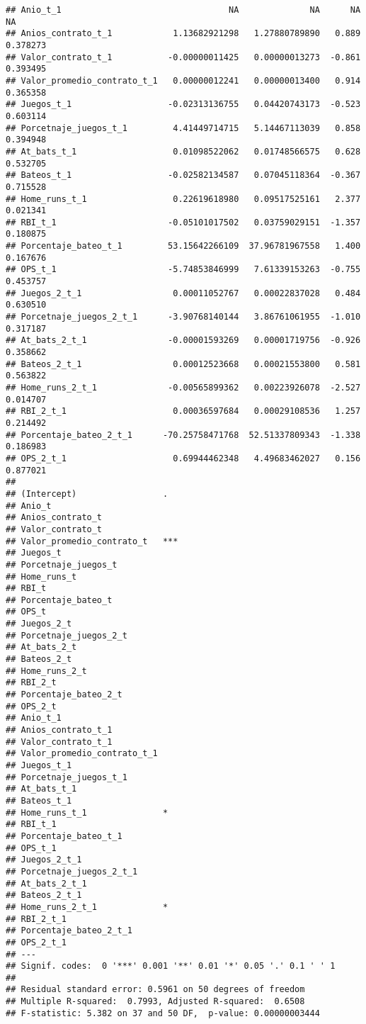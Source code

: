 \documentclass[
]{article}
\begin{document}
\begin{verbatim}
## Anio_t_1                                 NA              NA      NA       NA
## Anios_contrato_t_1            1.13682921298   1.27880789890   0.889 0.378273
## Valor_contrato_t_1           -0.00000011425   0.00000013273  -0.861 0.393495
## Valor_promedio_contrato_t_1   0.00000012241   0.00000013400   0.914 0.365358
## Juegos_t_1                   -0.02313136755   0.04420743173  -0.523 0.603114
## Porcetnaje_juegos_t_1         4.41449714715   5.14467113039   0.858 0.394948
## At_bats_t_1                   0.01098522062   0.01748566575   0.628 0.532705
## Bateos_t_1                   -0.02582134587   0.07045118364  -0.367 0.715528
## Home_runs_t_1                 0.22619618980   0.09517525161   2.377 0.021341
## RBI_t_1                      -0.05101017502   0.03759029151  -1.357 0.180875
## Porcentaje_bateo_t_1         53.15642266109  37.96781967558   1.400 0.167676
## OPS_t_1                      -5.74853846999   7.61339153263  -0.755 0.453757
## Juegos_2_t_1                  0.00011052767   0.00022837028   0.484 0.630510
## Porcetnaje_juegos_2_t_1      -3.90768140144   3.86761061955  -1.010 0.317187
## At_bats_2_t_1                -0.00001593269   0.00001719756  -0.926 0.358662
## Bateos_2_t_1                  0.00012523668   0.00021553800   0.581 0.563822
## Home_runs_2_t_1              -0.00565899362   0.00223926078  -2.527 0.014707
## RBI_2_t_1                     0.00036597684   0.00029108536   1.257 0.214492
## Porcentaje_bateo_2_t_1      -70.25758471768  52.51337809343  -1.338 0.186983
## OPS_2_t_1                     0.69944462348   4.49683462027   0.156 0.877021
##                                
## (Intercept)                 .  
## Anio_t                         
## Anios_contrato_t               
## Valor_contrato_t               
## Valor_promedio_contrato_t   ***
## Juegos_t                       
## Porcetnaje_juegos_t            
## Home_runs_t                    
## RBI_t                          
## Porcentaje_bateo_t             
## OPS_t                          
## Juegos_2_t                     
## Porcetnaje_juegos_2_t          
## At_bats_2_t                    
## Bateos_2_t                     
## Home_runs_2_t                  
## RBI_2_t                        
## Porcentaje_bateo_2_t           
## OPS_2_t                        
## Anio_t_1                       
## Anios_contrato_t_1             
## Valor_contrato_t_1             
## Valor_promedio_contrato_t_1    
## Juegos_t_1                     
## Porcetnaje_juegos_t_1          
## At_bats_t_1                    
## Bateos_t_1                     
## Home_runs_t_1               *  
## RBI_t_1                        
## Porcentaje_bateo_t_1           
## OPS_t_1                        
## Juegos_2_t_1                   
## Porcetnaje_juegos_2_t_1        
## At_bats_2_t_1                  
## Bateos_2_t_1                   
## Home_runs_2_t_1             *  
## RBI_2_t_1                      
## Porcentaje_bateo_2_t_1         
## OPS_2_t_1                      
## ---
## Signif. codes:  0 '***' 0.001 '**' 0.01 '*' 0.05 '.' 0.1 ' ' 1
## 
## Residual standard error: 0.5961 on 50 degrees of freedom
## Multiple R-squared:  0.7993, Adjusted R-squared:  0.6508 
## F-statistic: 5.382 on 37 and 50 DF,  p-value: 0.00000003444
\end{verbatim}
\end{document}
